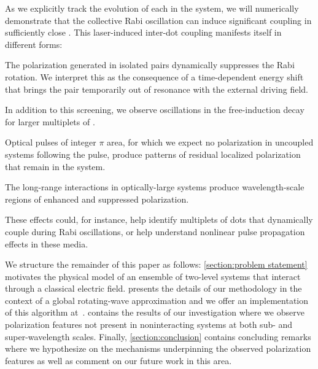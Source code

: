 As we explicitly track the evolution of each \qd{} in the system, we will numerically demonstrate that the collective Rabi oscillation can induce significant coupling in sufficiently close \qds{}.
This laser-induced inter-dot coupling manifests itself in different forms:
\begin{inparaenum}[(i)]
  \item The polarization generated in isolated \qd{} pairs dynamically suppresses the Rabi rotation.
  We interpret this as the consequence of a time-dependent energy shift that brings the pair temporarily out of resonance with the external driving field.
  \item In addition to this screening, we observe oscillations in the free-induction decay for larger multiplets of \qds{}.
  \item Optical pulses of integer $\pi$ area, for which we expect no polarization in uncoupled systems following the pulse, produce patterns of residual localized polarization that remain in the system.
  \item The long-range interactions in optically-large systems produce wavelength-scale regions of enhanced and suppressed polarization.
\end{inparaenum}
These effects could, for instance, help identify multiplets of dots that dynamically couple during Rabi oscillations, or help understand nonlinear pulse propagation effects in these media.

We structure the remainder of this paper as follows: \cref{section:problem statement} motivates the physical model of an ensemble of two-level systems that interact through a classical electric field.
 presents the details of our methodology in the context of a global rotating-wave approximation and we offer an implementation of this algorithm at~\cite{quest_release}.
 contains the results of our investigation where we observe polarization features not present in noninteracting systems at both sub- and super-wavelength scales.
Finally, \cref{section:conclusion} contains concluding remarks where we hypothesize on the mechanisms underpinning the observed polarization features as well as comment on our future work in this area.
